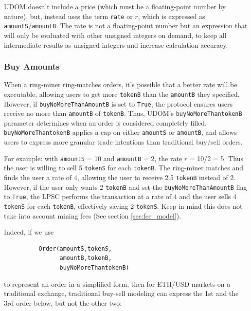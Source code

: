 \documentclass[UTF8,nofonts]{article}
\begin{document}
\begin{multicols}{2}
UDOM doesn't include a price (which must be a floating-point number by nature), but, instead uses the term \verb|rate| or $r$, which is expressed as \verb|amountS|/\verb|amountB|. The rate is not a floating-point number but an expression that will only be evaluated with other unsigned integers on demand, to keep all intermediate results as unsigned integers and increase calculation accuracy. 

\subsubsection{Buy Amounts}

When a ring-miner ring-matches orders, it's possible that a better rate will be executable, allowing users to get more \verb|tokenB| than the \verb|amountB| they specified. However, if \verb|buyNoMoreThanAmountB| is set to \verb|True|, the protocol ensures users receive no more than \verb|amountB| of \verb|tokenB|. Thus, UDOM's \verb|buyNoMoreThantokenB| parameter determines when an order is considered completely filled. \verb|buyNoMoreThantokenB| applies a cap on either \verb|amountS| or \verb|amountB|, and allows users to express more granular trade intentions than traditional buy/sell orders.

For example: with \verb|amountS| = 10 and \verb|amountB| = 2, the rate $r$ = 10/2 = 5. Thus the user is willing to sell 5 \verb|tokenS| for each \verb|tokenB|. The ring-miner matches and finds the user a rate of 4, allowing the user to receive 2.5 \verb|tokenB| instead of 2. However, if the user only wants 2 \verb|tokenB| and set the \verb|buyNoMoreThanAmountB| flag to \verb|True|, the LPSC performs the transaction at a rate of 4 and the user sells 4 \verb|tokenS| for each \verb|tokenB|, effectively saving 2 \verb|tokenS|. Keep in mind this does not take into account mining fees (See section \ref{sec:fee_model}).

Indeed, if we use


\begin{verbatim}
	      Order(amountS,tokenS,
	            amountB,tokenB,
	            buyNoMoreThantokenB)
\end{verbatim}

to represent an order in a simplified form, then for ETH/USD markets on a traditional exchange, traditional buy-sell modeling can express the 1st and the 3rd order below, but not the other two:


\end{multicols}
\end{document}
